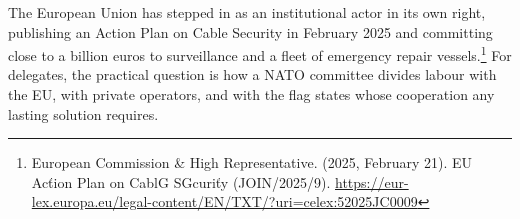 The European Union has stepped in as an institutional actor in its own right, publishing an Action Plan on Cable Security in February 2025 and committing close to a billion euros to surveillance and a fleet of emergency repair vessels.\footnote{European Commission \& High Representative. (2025, February 21). EU Acťion Plan on CablG SGcuriťy (JOIN/2025/9). \url{https://eur-lex.europa.eu/legal-content/EN/TXT/?uri=celex:52025JC0009}} For delegates, the practical question is how a NATO committee divides labour with the EU, with private operators, and with the flag states whose cooperation any lasting solution requires.
